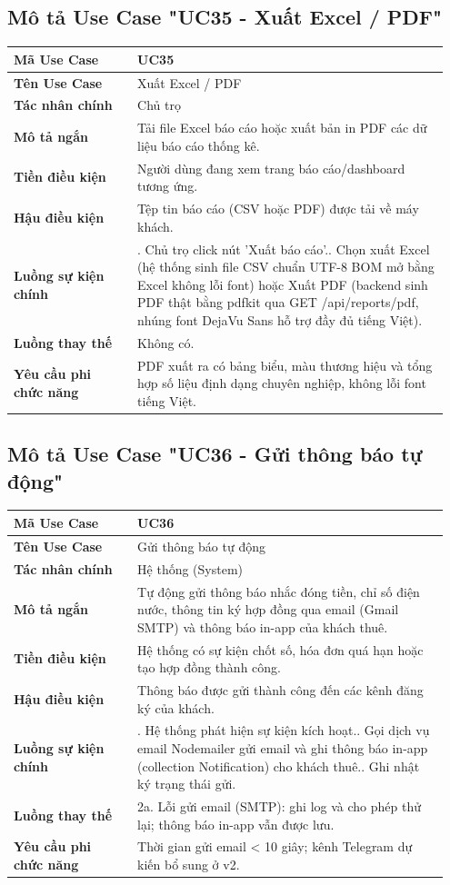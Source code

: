\subsection{Mô tả Use Case "UC35 - Xuất Excel / PDF"}

\begin{longtable}[]{@{}>{\RaggedRight\arraybackslash}p{0.27\linewidth}>{\RaggedRight\arraybackslash}p{0.68\linewidth}@{}}
\toprule
\textbf{Mã Use Case} & UC35\tabularnewline
\midrule
\endhead
\textbf{Tên Use Case} & Xuất Excel / PDF\tabularnewline
\textbf{Tác nhân chính} & Chủ trọ\tabularnewline
\textbf{Mô tả ngắn} & Tải file Excel báo cáo hoặc xuất bản in PDF các dữ
liệu báo cáo thống kê.\tabularnewline
\textbf{Tiền điều kiện} & Người dùng đang xem trang báo cáo/dashboard
tương ứng.\tabularnewline
\textbf{Hậu điều kiện} & Tệp tin báo cáo (CSV hoặc PDF) được tải về máy
khách.\tabularnewline
\textbf{Luồng sự kiện chính} & 1. Chủ trọ click nút
'Xuất báo cáo'.\newline 2. Chọn xuất Excel (hệ thống sinh file CSV
chuẩn UTF-8 BOM mở bằng Excel không lỗi font) hoặc Xuất PDF (backend
sinh PDF thật bằng pdfkit qua GET /api/reports/pdf, nhúng font DejaVu
Sans hỗ trợ đầy đủ tiếng Việt).\tabularnewline
\textbf{Luồng thay thế} & Không có.\tabularnewline
\textbf{Yêu cầu phi chức năng} & PDF xuất ra có bảng biểu, màu thương
hiệu và tổng hợp số liệu định dạng chuyên nghiệp, không lỗi font tiếng
Việt.\tabularnewline
\bottomrule
\end{longtable}

\subsection{Mô tả Use Case "UC36 - Gửi thông báo tự động"}

\begin{longtable}[]{@{}>{\RaggedRight\arraybackslash}p{0.27\linewidth}>{\RaggedRight\arraybackslash}p{0.68\linewidth}@{}}
\toprule
\textbf{Mã Use Case} & UC36\tabularnewline
\midrule
\endhead
\textbf{Tên Use Case} & Gửi thông báo tự động\tabularnewline
\textbf{Tác nhân chính} & Hệ thống (System)\tabularnewline
\textbf{Mô tả ngắn} & Tự động gửi thông báo nhắc đóng tiền, chỉ số điện
nước, thông tin ký hợp đồng qua email (Gmail SMTP) và thông báo in-app
của khách thuê.\tabularnewline
\textbf{Tiền điều kiện} & Hệ thống có sự kiện chốt số, hóa đơn quá hạn
hoặc tạo hợp đồng thành công.\tabularnewline
\textbf{Hậu điều kiện} & Thông báo được gửi thành công đến các kênh đăng
ký của khách.\tabularnewline
\textbf{Luồng sự kiện chính} & 1. Hệ thống phát hiện
sự kiện kích hoạt.\newline 2. Gọi dịch vụ email Nodemailer gửi
email và ghi thông báo in-app (collection Notification) cho khách
thuê.\newline 3. Ghi nhật ký trạng thái gửi.\tabularnewline
\textbf{Luồng thay thế} & 2a. Lỗi gửi email (SMTP): ghi log và cho phép
thử lại; thông báo in-app vẫn được lưu.\tabularnewline
\textbf{Yêu cầu phi chức năng} & Thời gian gửi email \textless{} 10
giây; kênh Telegram dự kiến bổ sung ở v2.\tabularnewline
\bottomrule
\end{longtable}

